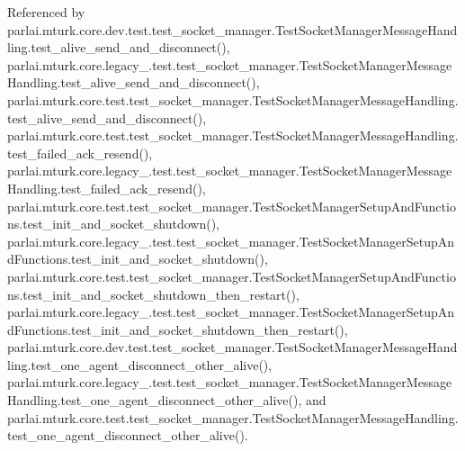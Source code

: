Referenced by parlai.\+mturk.\+core.\+dev.\+test.\+test\+\_\+socket\+\_\+manager.\+Test\+Socket\+Manager\+Message\+Handling.\+test\+\_\+alive\+\_\+send\+\_\+and\+\_\+disconnect(), parlai.\+mturk.\+core.\+legacy\+\_.\+test.\+test\+\_\+socket\+\_\+manager.\+Test\+Socket\+Manager\+Message\+Handling.\+test\+\_\+alive\+\_\+send\+\_\+and\+\_\+disconnect(), parlai.\+mturk.\+core.\+test.\+test\+\_\+socket\+\_\+manager.\+Test\+Socket\+Manager\+Message\+Handling.\+test\+\_\+alive\+\_\+send\+\_\+and\+\_\+disconnect(), parlai.\+mturk.\+core.\+test.\+test\+\_\+socket\+\_\+manager.\+Test\+Socket\+Manager\+Message\+Handling.\+test\+\_\+failed\+\_\+ack\+\_\+resend(), parlai.\+mturk.\+core.\+legacy\+\_.\+test.\+test\+\_\+socket\+\_\+manager.\+Test\+Socket\+Manager\+Message\+Handling.\+test\+\_\+failed\+\_\+ack\+\_\+resend(), parlai.\+mturk.\+core.\+test.\+test\+\_\+socket\+\_\+manager.\+Test\+Socket\+Manager\+Setup\+And\+Functions.\+test\+\_\+init\+\_\+and\+\_\+socket\+\_\+shutdown(), parlai.\+mturk.\+core.\+legacy\+\_.\+test.\+test\+\_\+socket\+\_\+manager.\+Test\+Socket\+Manager\+Setup\+And\+Functions.\+test\+\_\+init\+\_\+and\+\_\+socket\+\_\+shutdown(), parlai.\+mturk.\+core.\+test.\+test\+\_\+socket\+\_\+manager.\+Test\+Socket\+Manager\+Setup\+And\+Functions.\+test\+\_\+init\+\_\+and\+\_\+socket\+\_\+shutdown\+\_\+then\+\_\+restart(), parlai.\+mturk.\+core.\+legacy\+\_.\+test.\+test\+\_\+socket\+\_\+manager.\+Test\+Socket\+Manager\+Setup\+And\+Functions.\+test\+\_\+init\+\_\+and\+\_\+socket\+\_\+shutdown\+\_\+then\+\_\+restart(), parlai.\+mturk.\+core.\+dev.\+test.\+test\+\_\+socket\+\_\+manager.\+Test\+Socket\+Manager\+Message\+Handling.\+test\+\_\+one\+\_\+agent\+\_\+disconnect\+\_\+other\+\_\+alive(), parlai.\+mturk.\+core.\+legacy\+\_.\+test.\+test\+\_\+socket\+\_\+manager.\+Test\+Socket\+Manager\+Message\+Handling.\+test\+\_\+one\+\_\+agent\+\_\+disconnect\+\_\+other\+\_\+alive(), and parlai.\+mturk.\+core.\+test.\+test\+\_\+socket\+\_\+manager.\+Test\+Socket\+Manager\+Message\+Handling.\+test\+\_\+one\+\_\+agent\+\_\+disconnect\+\_\+other\+\_\+alive().


